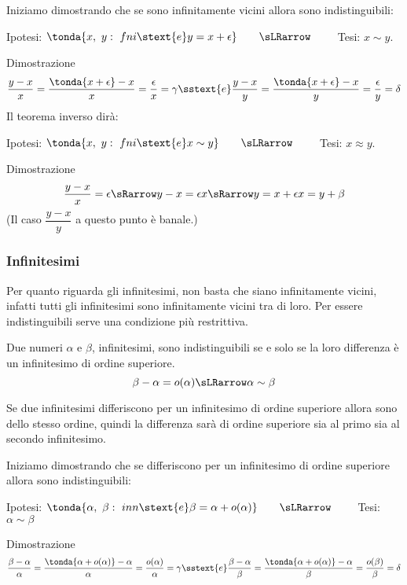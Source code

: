 Iniziamo dimostrando che se sono infinitamente vicini allora sono 
indistinguibili:
\begin{center}
Ipotesi: \(\tonda{x,~y:\ fni \stext{e} y = x+\epsilon} \qquad \sLRarrow 
\qquad\) 
Tesi: \(x \sim y\).
\end{center}
Dimostrazione
\[\frac{y-x}{x}=\frac{\tonda{x+\epsilon}-x}{x} = 
\frac{\epsilon}{x}= \gamma \sstext{e} 
\frac{y-x}{y}=\frac{\tonda{x+\epsilon}-x}{y} = 
\frac{\epsilon}{y}= \delta
\]
Il teorema inverso dirà:
\begin{center}
Ipotesi: \(\tonda{x,~y:\ fni \stext{e} x \sim y} \qquad \sLRarrow \qquad\) 
Tesi: \(x \approx y\).
\end{center}
Dimostrazione
\[\frac{y-x}{x} = \epsilon
\sRarrow y-x = \epsilon x \sRarrow y = x+\epsilon x = y+\beta
\]
(Il caso $\dfrac{y-x}{y}$ a questo punto è banale.)

\subsubsection{Infinitesimi}
\label{subsubsec:insnum_infinitesimi}

Per quanto riguarda gli infinitesimi, non basta che siano infinitamente 
vicini, infatti tutti gli infinitesimi sono infinitamente vicini tra di 
loro.
Per essere indistinguibili serve una condizione più restrittiva.

\begin{teorema}
Due numeri \(\alpha\) e \(\beta\), infinitesimi, 
sono indistinguibili se e solo se la loro differenza è un infinitesimo di 
ordine superiore.
\[\beta-\alpha = o(\alpha) \sLRarrow \alpha \sim \beta\] 
\end{teorema}

\begin{osservazione}
Se due infinitesimi differiscono per un infinitesimo di ordine superiore 
allora sono dello stesso ordine, quindi la differenza sarà di ordine 
superiore sia al primo sia al secondo infinitesimo.
\end{osservazione}

Iniziamo dimostrando che se differiscono per un infinitesimo di ordine 
superiore allora sono indistinguibili:
\begin{center}
Ipotesi: \(\tonda{\alpha,~\beta:\ inn \stext{e} \beta = \alpha +o(\alpha)}
\qquad \sLRarrow\qquad\) 
Tesi: \(\alpha \sim \beta\)
\end{center}
Dimostrazione
\[\frac{\beta-\alpha}{\alpha}=
\frac{\tonda{\alpha +o(\alpha)}-\alpha}{\alpha} = 
\frac{o(\alpha)}{\alpha}= \gamma \sstext{e} 
\frac{\beta-\alpha}{\beta}=
\frac{\tonda{\alpha +o(\alpha)}-\alpha}{\beta} = 
\frac{o(\beta)}{\beta}= \delta
\]

